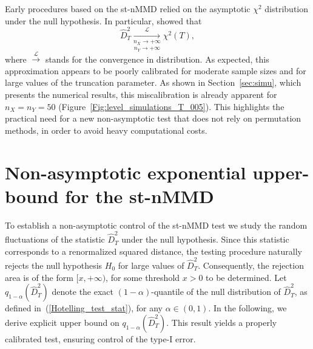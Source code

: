 \documentclass[twoside,11pt]{article}
\newcommand{\trueq}[1]{q_{1-\alpha}(#1) }
\begin{document}
Early procedures based on the st-nMMD relied on the asymptotic $\chi^2$ distribution under the null hypothesis. In particular, \cite{eric2007testing} showed that $$\widehat{D}^2_T \underset{n_Y \rightarrow + \infty}{\underset{n_X \rightarrow + \infty}{\overset{\mathcal{L}}{\longrightarrow}}}\chi^2(T),$$ where $\overset{\mathcal{L}}{\rightarrow}$ stands for the convergence in distribution. As expected, this approximation appears to be poorly calibrated for moderate sample sizes and for large values of the truncation parameter. As shown in Section~\ref{sec:simu}, which presents the numerical results, this miscalibration is already apparent for $n_X = n_Y = 50$ (Figure~\ref{Fig:level_simulations_T_005}). This highlights the practical need for a new non-asymptotic test that does not rely on permutation methods, in order to avoid heavy computational costs.
\section{Non-asymptotic exponential upper-bound for the st-nMMD}
\label{sec:theory}
To establish a non-asymptotic control of the st-nMMD test we study the random fluctuations of the statistic $\widehat{D}^2_T$ under the null hypothesis. Since this statistic corresponds to a renormalized squared distance, the testing procedure naturally rejects the null hypothesis $H_0$ for large values of $\widehat{D}^2_T$. Consequently, the rejection area is of the form $[x, +\infty)$, for some threshold $x > 0$ to be determined.  Let $\trueq{\widehat{D}^2_T}$ denote the exact $(1-\alpha)$-quantile of the null distribution of $\widehat{D}^2_T$, as defined in~(\ref{Hotelling_test_stat}), for any $\alpha \in (0,1)$. In the following, we derive  explicit upper bound on $\trueq{\widehat{D}^2_T}$. 
This result yields a properly calibrated test, ensuring control of the type-I error. 	
\end{document}
